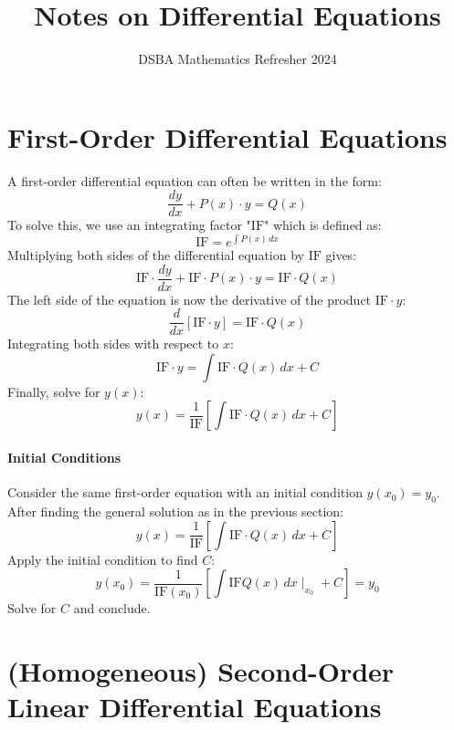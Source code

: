 \documentclass[]{article}
\title{Notes on Differential Equations}
\author{DSBA Mathematics Refresher 2024}
\date{}
\begin{document}
	
	\maketitle
	
	\begin{abstract}
		
	\end{abstract}
	
	
	\section{First-Order Differential Equations}
	
	A first-order differential equation can often be written in the form:
	$$
	\frac{dy}{dx} + P(x) \cdot y = Q(x)
	$$
	To solve this, we use an integrating factor "$\text{IF}$" which is defined as:
	$$
	\text{IF} = e^{\int P(x) \, dx}
	$$
	Multiplying both sides of the differential equation by $\text{IF}$ gives:
	$$
	\text{IF} \cdot \frac{dy}{dx} + \text{IF} \cdot P(x) \cdot y = \text{IF} \cdot Q(x)
	$$
	The left side of the equation is now the derivative of the product $\text{IF} \cdot y$:
	$$
	\frac{d}{dx}\left[\text{IF} \cdot y\right] = \text{IF} \cdot Q(x)
	$$
	Integrating both sides with respect to $x$:
	$$
	\text{IF} \cdot y = \int \text{IF} \cdot Q(x) \, dx + C
	$$
	Finally, solve for $y(x)$:
	$$
	y(x) = \frac{1}{\text{IF}}\left[\int \text{IF} \cdot Q(x) \, dx + C\right]
	$$
	
	\paragraph{Initial Conditions}
	
	Consider the same first-order equation with an initial condition $y(x_0) = y_0$.
	After finding the general solution as in the previous section:
	$$
	y(x) = \frac{1}{\text{IF}}\left[\int \text{IF} \cdot Q(x) \, dx + C\right]
	$$
	Apply the initial condition to find $C$:
	$$
	y(x_0) = \frac{1}{\text{IF}(x_0)}\left[\int \text{IF}Q(x) \, dx \mid_{x_0} + C\right] = y_0
	$$
	Solve for $C$ and conclude.
	
	\section{(Homogeneous) Second-Order Linear Differential Equations}
	
\end{document}
